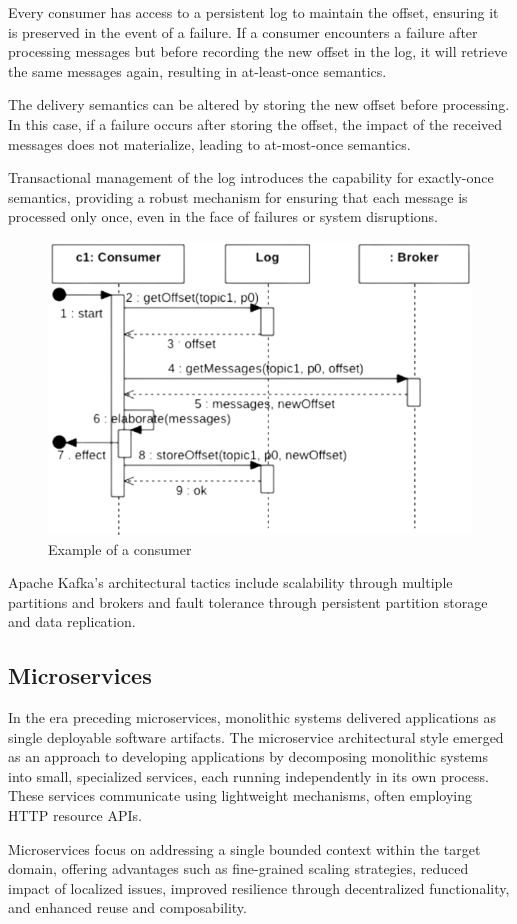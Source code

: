 Every consumer has access to a persistent log to maintain the offset, ensuring it is preserved in the event of a failure. 
If a consumer encounters a failure after processing messages but before recording the new offset in the log, it will retrieve the same messages again, resulting in at-least-once semantics.

The delivery semantics can be altered by storing the new offset before processing. 
In this case, if a failure occurs after storing the offset, the impact of the received messages does not materialize, leading to at-most-once semantics.

Transactional management of the log introduces the capability for exactly-once semantics, providing a robust mechanism for ensuring that each message is processed only once, even in the face of failures or system disruptions.
\begin{figure}[H]
    \centering
    \includegraphics[width=0.4\linewidth]{images/consumer.png}
    \caption{Example of a consumer}
\end{figure}
Apache Kafka's architectural tactics include scalability through multiple partitions and brokers and fault tolerance through persistent partition storage and data replication.

\subsection*{Microservices}
In the era preceding microservices, monolithic systems delivered applications as single deployable software artifacts. 
The microservice architectural style emerged as an approach to developing applications by decomposing monolithic systems into small, specialized services, each running independently in its own process. 
These services communicate using lightweight mechanisms, often employing HTTP resource APIs.

Microservices focus on addressing a single bounded context within the target domain, offering advantages such as fine-grained scaling strategies, reduced impact of localized issues, improved resilience through decentralized functionality, and enhanced reuse and composability.

